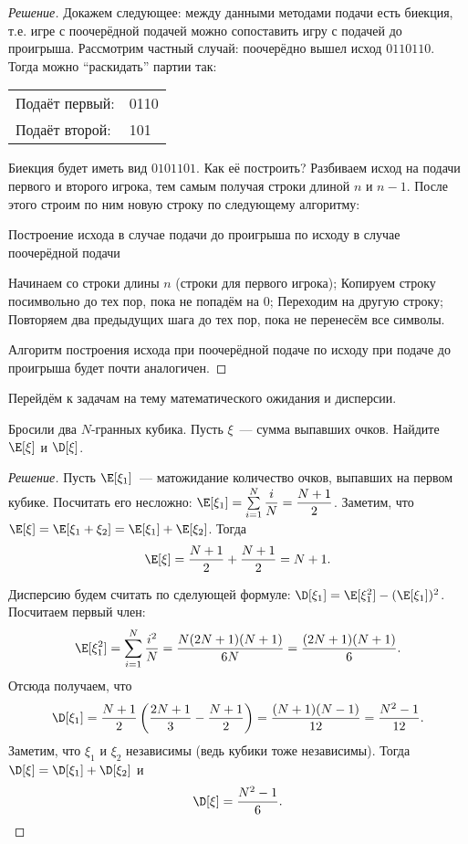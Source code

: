 \begin{proof}[Решение]
    Докажем следующее: между данными методами подачи есть биекция, т.е. игре с поочерёдной подачей можно сопоставить игру с подачей до проигрыша. Рассмотрим частный случай: поочерёдно вышел исход \(0110110\). Тогда можно ``раскидать'' партии так:
    \begin{center}
        \begin{tabular}{ll}
            Подаёт первый: &0110 \\
            Подаёт второй: &101
        \end{tabular}
    \end{center}
    Биекция будет иметь вид \(0101101\). Как её построить? Разбиваем исход на подачи первого и второго игрока, тем самым получая строки длиной \(n\) и \(n - 1\). После этого строим по ним новую строку по следующему алгоритму:
    \begin{algorithm}[H]
        \caption{Построение исхода в случае подачи до проигрыша по исходу в случае поочерёдной подачи}
        \begin{algorithmic}[1]
            \State Начинаем со строки длины \(n\) (строки для первого игрока);
            \State Копируем строку посимвольно до тех пор, пока не попадём на 0;
            \State Переходим на другую строку;
            \State Повторяем два предыдущих шага до тех пор, пока не перенесём все символы.
        \end{algorithmic}
    \end{algorithm}
    Алгоритм построения исхода при поочерёдной подаче по исходу при подаче до проигрыша будет почти аналогичен. 
\end{proof}

Перейдём к задачам на тему математического ожидания и дисперсии.
\begin{problem}
    Бросили два \(N\)-гранных кубика. Пусть \(\xi\)~--- сумма выпавших очков. Найдите \(\E[\xi]\) и \(\D[\xi]\). 
\end{problem}
\begin{proof}[Решение]
    Пусть \(\E[\xi_1]\)~--- матожидание количество очков, выпавших на первом кубике. Посчитать его несложно:
    \(\E[\xi_1] = \sum\limits_{i = 1}^{N}\dfrac{i}{N} = \dfrac{N + 1}{2}\). Заметим, что \(\E[\xi] = \E[\xi_1 + \xi_2] = \E[\xi_1] + \E[\xi_2]\). Тогда \[\E[\xi] = \frac{N + 1}{2} + \frac{N + 1}{2} = N + 1.\]
    
    Дисперсию будем считать по сделующей формуле: \(\D[\xi_1] = \E[\xi_1^2] - (\E[\xi_1])^2\).
    Посчитаем первый член: \[\E[\xi_1^2] = \sum_{i = 1}^{N}\frac{i^2}{N} = \frac{N(2N + 1)(N + 1)}{6N} = \frac{(2N + 1)(N + 1)}{6}.\]
    Отсюда получаем, что
    \[\D[\xi_1] = \frac{N + 1}{2}\left(\frac{2N + 1}{3} - \frac{N + 1}{2}\right) = \frac{(N + 1)(N - 1)}{12} = \frac{N^2 - 1}{12}.\]
    Заметим, что \(\xi_1\) и \(\xi_2\) независимы (ведь кубики тоже независимы). Тогда \(\D[\xi] = \D[\xi_1] + \D[\xi_2]\) и \[\D[\xi] = \dfrac{N^2 - 1}{6}.\qedhere\]
\end{proof}

